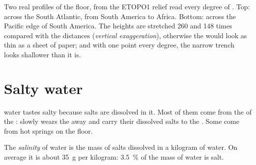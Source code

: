 \begin{omfigure}
{\small Two real profiles of the  floor, from the ETOPO1 relief read
every degree of . Top: across the South Atlantic, from South
America to Africa. Bottom: across the Pacific edge of South America. The
heights are stretched 260 and 148 times compared with the distances
(\emph{vertical exaggeration}), otherwise the  would look as thin as
a sheet of paper; and with one point every degree, the narrow trench looks
shallower than it is.}
\label{fig:g8:the-oceans:profiles}
\end{omfigure}


\section{Salty water}

 water tastes salty because salts are dissolved in it. Most of them
come from the  of the :  slowly wears the  away
and  carry their dissolved salts to the . Some come from hot
springs on the  floor.

\begin{definition}[Salinity]\label{def:g8:the-oceans:salinity}
The \emph{salinity} of  water is the mass of salts
dissolved in a kilogram of  water. On average it is about
\qty{35}{g} per kilogram: \qty{3.5}{\%} of the mass of  water is
salt.
\end{definition}


